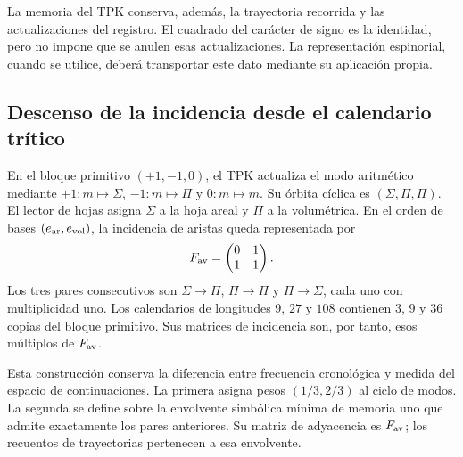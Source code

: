La memoria del TPK conserva, además, la trayectoria recorrida y las actualizaciones
del registro. El cuadrado del carácter de signo es la identidad, pero no impone
que se anulen esas actualizaciones. La representación espinorial, cuando se
utilice, deberá transportar este dato mediante su aplicación propia.

\subsection{Descenso de la incidencia desde el calendario trítico}

En el bloque primitivo $(+1,-1,0)$, el TPK actualiza el modo aritmético mediante
$+1:m\mapsto\Sigma$, $-1:m\mapsto\Pi$ y $0:m\mapsto m$. Su órbita cíclica
es $(\Sigma,\Pi,\Pi)$. El lector de hojas asigna $\Sigma$ a la hoja areal y
$\Pi$ a la volumétrica. En el orden de bases $(e_{\rm ar},e_{\rm vol})$, la
incidencia de aristas queda representada por
\begin{equation}
 F_{\rm av}=\begin{pmatrix}0&1\\1&1\end{pmatrix}.
 \label{iii:eq:fav}
\end{equation}
Los tres pares consecutivos son $\Sigma\to\Pi$, $\Pi\to\Pi$ y
$\Pi\to\Sigma$, cada uno con multiplicidad uno. Los calendarios de longitudes
$9$, $27$ y $108$ contienen $3$, $9$ y $36$ copias del bloque primitivo. Sus
matrices de incidencia son, por tanto, esos múltiplos de $F_{\rm av}$.

Esta construcción conserva la diferencia entre frecuencia cronológica y medida
del espacio de continuaciones. La primera asigna pesos $(1/3,2/3)$ al ciclo
de modos. La segunda se define sobre la envolvente simbólica mínima de memoria
uno que admite exactamente los pares anteriores. Su matriz de adyacencia es
$F_{\rm av}$; los recuentos de trayectorias pertenecen a esa envolvente.

